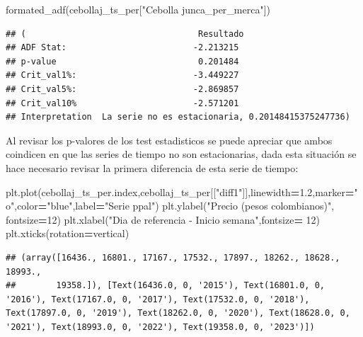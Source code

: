 \documentclass[
]{book}
\newenvironment{Shaded}{\begin{snugshade}}{\end{snugshade}}
\newcommand{\DecValTok}[1]{\textcolor[rgb]{0.00,0.00,0.81}{#1}}
\newcommand{\FloatTok}[1]{\textcolor[rgb]{0.00,0.00,0.81}{#1}}
\newcommand{\NormalTok}[1]{#1}
\newcommand{\OperatorTok}[1]{\textcolor[rgb]{0.81,0.36,0.00}{\textbf{#1}}}
\newcommand{\StringTok}[1]{\textcolor[rgb]{0.31,0.60,0.02}{#1}}
\begin{document}
\begin{Shaded}
\begin{Highlighting}[]
\NormalTok{formated\_adf(cebollaj\_ts\_per[}\StringTok{"Cebolla junca\_per\_merca"}\NormalTok{])}
\end{Highlighting}
\end{Shaded}

\begin{verbatim}
## (                                  Resultado
## ADF Stat:                         -2.213215
## p-value                            0.201484
## Crit_val1%:                       -3.449227
## Crit_val5%:                       -2.869857
## Crit_val10%                       -2.571201
## Interpretation  La serie no es estacionaria, 0.20148415375247736)
\end{verbatim}

Al revisar los p-valores de los test estadisticos se puede apreciar que ambos coindicen en que las series de tiempo no son estacionarias, dada esta situación se hace necesario revisar la primera diferencia de esta serie de tiempo:

\begin{Shaded}
\begin{Highlighting}[]

\NormalTok{plt.plot(cebollaj\_ts\_per.index,cebollaj\_ts\_per[[}\StringTok{"diff1"}\NormalTok{]],linewidth}\OperatorTok{=}\FloatTok{1.2}\NormalTok{,marker}\OperatorTok{=}\StringTok{"o"}\NormalTok{,color}\OperatorTok{=}\StringTok{"blue"}\NormalTok{,label}\OperatorTok{=}\StringTok{"Serie ppal"}\NormalTok{)}
\NormalTok{plt.ylabel(}\StringTok{"Precio (pesos colombianos)"}\NormalTok{, fontsize}\OperatorTok{=}\DecValTok{12}\NormalTok{)}
\NormalTok{plt.xlabel(}\StringTok{"Dia de referencia {-} Inicio semana"}\NormalTok{,fontsize}\OperatorTok{=} \DecValTok{12}\NormalTok{)}
\NormalTok{plt.xticks(rotation}\OperatorTok{=}\StringTok{\textquotesingle{}vertical\textquotesingle{}}\NormalTok{)}
\end{Highlighting}
\end{Shaded}

\begin{verbatim}
## (array([16436., 16801., 17167., 17532., 17897., 18262., 18628., 18993.,
##        19358.]), [Text(16436.0, 0, '2015'), Text(16801.0, 0, '2016'), Text(17167.0, 0, '2017'), Text(17532.0, 0, '2018'), Text(17897.0, 0, '2019'), Text(18262.0, 0, '2020'), Text(18628.0, 0, '2021'), Text(18993.0, 0, '2022'), Text(19358.0, 0, '2023')])
\end{verbatim}
\end{document}
